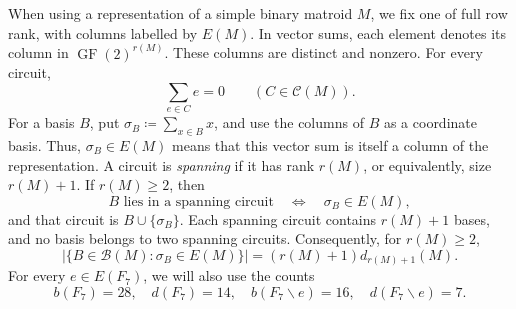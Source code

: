 \documentclass[10pt,a4paper]{article}
\numberwithin{equation}{section}
\DeclareMathOperator{\GF}{GF}
\newcommand{\BB}{\mathcal B}
\newcommand{\CC}{\mathcal C}
\newcommand{\FF}{\GF(2)}
\begin{document}
When using a representation of a simple binary matroid \(M\),
we fix one of full row rank, with columns labelled by \(E(M)\).
In vector sums, each element denotes its column in \(\FF^{r(M)}\).
These columns are distinct and nonzero. For every circuit,
\begin{equation}\label{eq:circuit-column-sum}
 \sum_{e\in C}e=0\qquad(C\in\CC(M)).
\end{equation}
For a basis \(B\), put \(\sigma_B\coloneqq\sum_{x\in B}x\),
and use the columns of \(B\) as a coordinate basis.
Thus, \(\sigma_B\in E(M)\) means that this vector sum is itself
a column of the representation.
A circuit is \emph{spanning} if it has rank \(r(M)\), or
equivalently, size \(r(M)+1\).
If \(r(M)\ge2\), then
\begin{equation}\label{eq:spanning-bases}
 B\text{ lies in a spanning circuit}
 \quad\Longleftrightarrow\quad \sigma_B\in E(M),
\end{equation}
and that circuit is \(B\cup\{\sigma_B\}\).
Each spanning circuit contains \(r(M)+1\) bases,
and no basis belongs to two spanning circuits.
Consequently, for \(r(M)\ge2\),
\begin{equation}\label{eq:spanning-basis-count}
 \bigl|\{B\in\BB(M):\sigma_B\in E(M)\}\bigr|
 =(r(M)+1)d_{r(M)+1}(M).
\end{equation}
For every \(e\in E(F_7)\), we will also use the counts
\begin{equation}\label{eq:fano}
 b(F_7)=28,\quad d(F_7)=14,\quad
 b(F_7\backslash e)=16,\quad d(F_7\backslash e)=7.
\end{equation}
\end{document}
